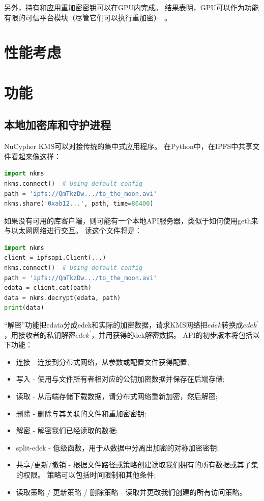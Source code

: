 \documentclass[longbibliography,nofootinbib]{revtex4-1}
\begin{document}
    另外，持有和应用重加密密钥可以在GPU内完成。 结果表明，GPU可以作为功能有限的可信平台模块（尽管它们可以执行重加密）~\cite{gpu-trusted}。


\section{性能考虑}

\section{功能}

\subsection{本地加密库和守护进程}

NuCypher KMS可以对接传统的集中式应用程序。 在Python中，在IPFS中共享文件看起来像这样：

\begin{lstlisting}[frame=single,language=Python]
import nkms
nkms.connect()  # Using default config
path = 'ipfs://QmTkzDw.../to_the_moon.avi'
nkms.share('0xab12...', path, time=86400)
\end{lstlisting}

如果没有可用的库客户端，则可能有一个本地API服务器，类似于如何使用geth来与以太网网络进行交互。 读这个文件将是：

\begin{lstlisting}[frame=single,language=Python]
import nkms
client = ipfsapi.Client(...)
nkms.connect()  # Using default config
path = 'ipfs://QmTkzDw.../to_the_moon.avi'
edata = client.cat(path)
data = nkms.decrypt(edata, path)
print(data)
\end{lstlisting}

“解密”功能把edata分成edek和实际的加密数据，请求KMS网络把$edek$转换成$edek^{\prime}$，用接收者的私钥解密$edek^{\prime}$，并用获得的dek解密数据。
  API的初步版本将包括以下功能：

\begin{itemize}
    \item 连接 - 连接到分布式网络，从参数或配置文件获得配置;
    \item 写入 - 使用与文件所有者相对应的公钥加密数据并保存在后端存储;
    \item 读取 - 从后端存储下载数据，请分布式网络重新加密，然后解密;
    \item 删除 - 删除与其关联的文件和重加密密钥;
    \item 解密 - 解密我们已经读取的数据;
    \item split-edek - 低级函数，用于从数据中分离出加密的对称加密密钥;
    \item 共享/更新/撤销 - 根据文件路径或策略创建读取我们拥有的所有数据或其子集的权限。 策略可以包括时间限制和其他条件;
    \item 读取策略 / 更新策略 / 删除策略 - 读取并更改我们创建的所有访问策略。
\end{itemize}
\end{document}
